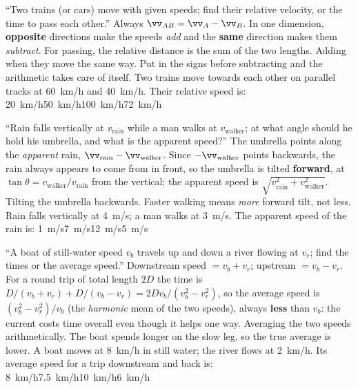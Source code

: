 {``Two trains (or cars) move with given speeds; find their relative velocity, or the time to pass each
other.''}
{Always $\vv_{AB}=\vv_A-\vv_B$. In one dimension, \textbf{opposite} directions make the speeds
\emph{add} and the \textbf{same} direction makes them \emph{subtract}. For passing, the relative distance
is the sum of the two lengths.}
{Adding when they move the same way. Put in the signs before subtracting and the arithmetic takes care
of itself.}
{Two trains move towards each other on parallel tracks at \SI{60}{km/h} and \SI{40}{km/h}. Their relative speed is:}
{\SI{20}{km/h}}{\SI{50}{km/h}}{\SI{100}{km/h}}{\SI{72}{km/h}}

{``Rain falls vertically at $v_{\text{rain}}$ while a man walks at $v_{\text{walker}}$; at what angle
should he hold his umbrella, and what is the apparent speed?''}
{The umbrella points along the \emph{apparent} rain, $\vv_{\text{rain}}-\vv_{\text{walker}}$. Since
$-\vv_{\text{walker}}$ points backwards, the rain always appears to come from in front, so the umbrella
is tilted \textbf{forward}, at $\tan\theta=v_{\text{walker}}/v_{\text{rain}}$ from the vertical; the
apparent speed is $\sqrt{v_{\text{rain}}^2+v_{\text{walker}}^2}$.}
{Tilting the umbrella backwards. Faster walking means \emph{more} forward tilt, not less.}
{Rain falls vertically at \SI{4}{m/s}; a man walks at \SI{3}{m/s}. The apparent speed of the rain is:}
{\SI{1}{m/s}}{\SI{7}{m/s}}{\SI{12}{m/s}}{\SI{5}{m/s}}

{``A boat of still-water speed $v_b$ travels up and down a river flowing at $v_r$; find the times or
the average speed.''}
{Downstream speed $=v_b+v_r$; upstream $=v_b-v_r$. For a round trip of total length $2D$ the time is
$D/(v_b+v_r)+D/(v_b-v_r)=2Dv_b/(v_b^2-v_r^2)$, so the average speed is $(v_b^2-v_r^2)/v_b$ (the
\emph{harmonic} mean of the two speeds), always \textbf{less} than $v_b$: the current costs time
overall even though it helps one way.}
{Averaging the two speeds arithmetically. The boat spends longer on the slow leg, so the true average is
lower.}
{A boat moves at \SI{8}{km/h} in still water; the river flows at \SI{2}{km/h}. Its average speed for a
trip downstream and back is:}
{\SI{8}{km/h}}{\SI{7.5}{km/h}}{\SI{10}{km/h}}{\SI{6}{km/h}}

